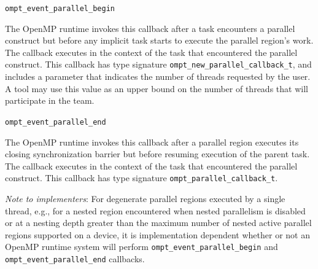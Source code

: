 \documentclass{article}
\newcommand{\descheader}[1]{{\needspace{3\baselineskip}\vspace{1em}\noindent \fbox{#1}}}
\begin{document}
\descheader{Parallel Regions}

\begin{description}

\item \verb|ompt_event_parallel_begin|

\sloppy
The OpenMP runtime invokes this callback 
after a task encounters a parallel construct
but before any implicit task starts to execute the
parallel region's work. The callback executes in the context of the task that encountered the parallel construct.
This callback has type signature \verb|ompt_new_parallel_callback_t|, and includes a parameter that indicates the number of threads requested by the user. 
A tool may use this value as an upper bound on the number of threads that will participate in the team.



\item \verb|ompt_event_parallel_end|

The OpenMP runtime invokes this callback 
after a parallel
region executes its closing synchronization barrier but before
resuming execution of the parent task.  The callback executes in
the context of the task that encountered the parallel construct.
This callback has type signature \verb|ompt_parallel_callback_t|. 

\end{description}

\noindent
{\em Note to implementers}: For degenerate parallel regions executed by a single thread, e.g., for
a nested region encountered when nested parallelism is disabled or at a nesting depth greater than the 
maximum number of nested active parallel regions supported on a device, 
it is implementation dependent whether or not an OpenMP runtime system will perform
 \verb|ompt_event_parallel_begin| and \verb|ompt_event_parallel_end| callbacks.


% 
% 
% 
% 
% 
%   
\end{document}
